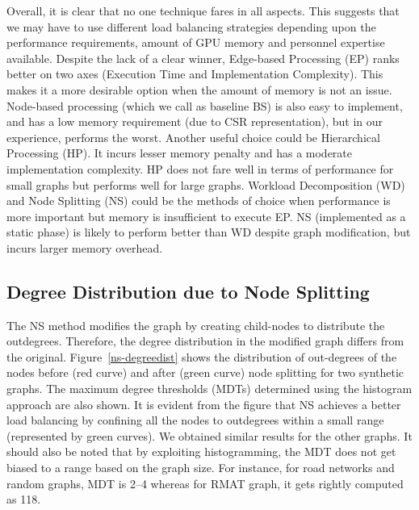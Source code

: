 Overall, it is clear that no one technique fares in all aspects. This suggests that we may have to use different load balancing strategies depending upon the performance requirements, amount of GPU memory and personnel expertise available. Despite the lack of a clear winner, Edge-based Processing (EP) ranks better on two axes (Execution Time and Implementation Complexity). This makes it a more desirable option when the amount of memory is not an issue. 
Node-based processing (which we call as baseline BS) is also easy to implement, and has a low memory requirement (due to CSR representation), but in our experience, performs the worst. Another useful choice could be Hierarchical Processing (HP). It incurs lesser memory penalty and has a moderate implementation complexity. HP does not fare well in terms of performance for small graphs but performs well for large graphs.
Workload Decomposition (WD) and Node Splitting (NS) could be the methods of choice when performance is more important but memory is insufficient to execute EP. NS (implemented as a static phase) is likely to perform better than WD despite graph modification, but incurs larger memory overhead.

\subsection{Degree Distribution due to Node Splitting}
The NS method modifies the graph by creating child-nodes to distribute the outdegrees.
Therefore, the degree distribution in the modified graph differs from the original.
Figure~\ref{ns-degreedist} shows the distribution of out-degrees of the nodes before (red curve) and after (green curve) node splitting for two synthetic graphs.
The maximum degree thresholds (MDTs) determined using the histogram approach are also shown. 
It is evident from the figure that NS achieves a better load balancing by confining all the nodes to outdegrees within a small range (represented by green curves). We obtained similar results for the other graphs.
It should also be noted that by exploiting histogramming, the MDT does not get biased to a range based on the graph size. %
For instance, for road networks and random graphs, MDT is 2--4 whereas for RMAT graph, it gets rightly computed as 118.

